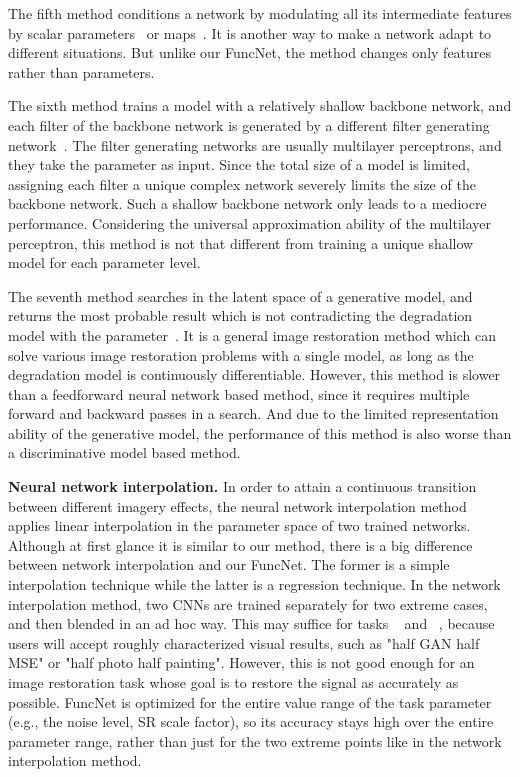 \documentclass{article}
\begin{document}
The fifth method conditions a network by modulating all its intermediate features by scalar parameters~\cite{choi2019variable,he2020interactive} or maps~\cite{wang2018recovering}. It is another way to make a network adapt to different situations. But unlike our FuncNet, the method changes only features rather than parameters.

The sixth method trains a model with a relatively shallow backbone network, and each filter of the backbone network is generated by a different filter generating network~\cite{klein2015dynamic,jia2016dynamic,kang2016crowd,ehrlich2020quantization}. The filter generating networks are usually multilayer perceptrons, and they take the parameter as input. Since the total size of a model is limited, assigning each filter a unique complex network severely limits the size of the backbone network. Such a shallow backbone network only leads to a mediocre performance. Considering the universal approximation ability of the multilayer perceptron, this method is not that different from training a unique shallow model for each parameter level.

The seventh method searches in the latent space of a generative model, and returns the most probable result which is not contradicting the degradation model with the parameter~\cite{yeh2017semantic,luo2020maximum}. It is a general image restoration method which can solve various image restoration problems with a single model, as long as the degradation model is continuously differentiable. However, this method is slower than a feedforward neural network based method, since it requires multiple forward and backward passes in a search. And due to the limited representation ability of the generative model, the performance of this method is also worse than a discriminative model based method.

\textbf{Neural network interpolation.} In order to attain a continuous transition between different imagery effects, the neural network interpolation method~\cite{wang2018esrgan,wang2019deep,wang2019cfsnet} applies linear interpolation in the parameter space of two trained networks. Although at first glance it is similar to our method, there is a big difference between network interpolation and our FuncNet. The former is a simple interpolation technique while the latter is a regression technique. In the network interpolation method, two CNNs are trained separately for two extreme cases, and then blended in an ad hoc way. This may suffice for tasks ~\cite{wang2018esrgan} and ~\cite{wang2019deep}, because users will accept roughly characterized visual results, such as "half GAN half MSE" or "half photo half painting". However, this is not good enough for an image restoration task whose goal is to restore the signal as accurately as possible. FuncNet is optimized for the entire value range of the task parameter (e.g., the noise level, SR scale factor), so its accuracy stays high over the entire parameter range, rather than just for the two extreme points like in the network interpolation method.
\end{document}
